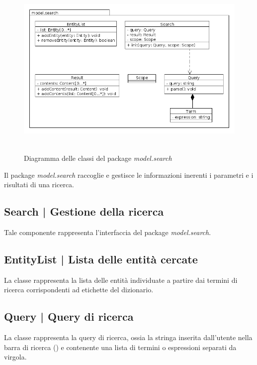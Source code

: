 \documentclass[10pt,a4paper,headinclude,footinclude,hidelinks]{scrreprt} %
\begin{document}
	\begin{figure}[ht]
		\begin{center}
	    	\includegraphics[height=8cm]{class/model_search.png}
			\label{gfx:package:model:search}
			\caption{Diagramma delle classi del package \textit{model.search}}
		\end{center}
	\end{figure}

	Il package \textit{model.search} raccoglie e gestisce le informazioni inerenti i parametri e i risultati di una ricerca. 

	\subsection[Search]{Search | Gestione della ricerca}
	\label{sec:stage:design:model.search:search}
	Tale componente rappresenta l'interfaccia del package \textit{model.search}.

	\subsection[EntityList]{EntityList | Lista delle entità cercate}
	\label{sec:stage:design:model.search:search-entity-list}
	La classe \textit{} rappresenta la lista delle entità individuate a partire dai termini di ricerca corrispondenti ad etichette del dizionario.

	\subsection[Query]{Query | Query di ricerca}
	\label{sec:stage:design:model.search:search-query}
	La classe \textit{} rappresenta la query di ricerca, ossia la stringa inserita dall'utente nella barra di ricerca (\textit{}) e contenente una lista di termini o espressioni separati da virgola.
\end{document}
